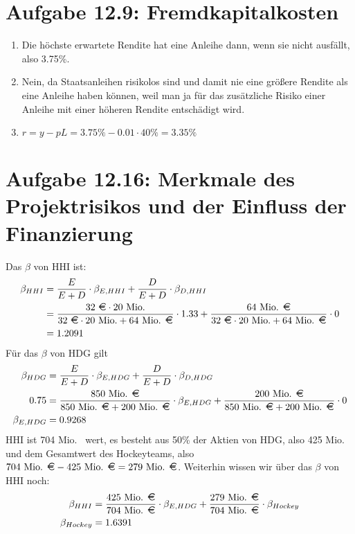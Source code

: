 \documentclass{article}
\begin{document}
	\section*{Aufgabe 12.9: Fremdkapitalkosten}
	\begin{enumerate}[label=(\alph*)]
		\item Die höchste erwartete Rendite hat eine Anleihe dann, wenn sie nicht ausfällt, also 3.75\%.
		\item Nein, da Staatsanleihen risikolos sind und damit nie eine größere Rendite als eine Anleihe haben können, weil man ja für das zusätzliche Risiko einer Anleihe mit einer höheren Rendite entschädigt wird.
		\item $r=y-pL = 3.75\% - 0.01\cdot 40\% = 3.35\%$
	\end{enumerate}

	\section*{Aufgabe 12.16: Merkmale des Projektrisikos und der Einfluss der Finanzierung}
	Das $\beta$ von HHI ist:
	\begin{align}
		\beta_{HHI} &= \frac{E}{E+D}\cdot\beta_{E,HHI} + \frac{D}{E+D}\cdot\beta_{D,HHI} \notag \\
		&= \frac{32\text{ \EUR}\cdot 20\text{ Mio.}}{32\text{ \EUR}\cdot 20\text{ Mio.} + 64\text{ Mio. \EUR}}\cdot 1.33 + \frac{64\text{ Mio. \EUR}}{32\text{ \EUR}\cdot 20\text{ Mio.} + 64\text{ Mio. \EUR}}\cdot 0 \notag \\
		&= 1.2091 \notag
	\end{align}
	Für das $\beta$ von HDG gilt
	\begin{align}
		\beta_{HDG} &= \frac{E}{E+D}\cdot\beta_{E,HDG} + \frac{D}{E+D}\cdot\beta_{D,HDG} \notag \\
		0.75 &= \frac{850\text{ Mio. \EUR}}{850\text{ Mio. \EUR} + 200\text{ Mio. \EUR}}\cdot \beta_{E,HDG} + \frac{200\text{ Mio. \EUR}}{850\text{ Mio. \EUR} + 200\text{ Mio. \EUR}}\cdot 0 \notag \\
		\beta_{E,HDG} &= 0.9268\notag
	\end{align}
	HHI ist 704 Mio. \EUR\, wert, es besteht aus 50\% der Aktien von HDG, also 425 Mio. \EUR\, und dem Gesamtwert des Hockeyteams, also $704\text{ Mio. \EUR} - 425\text{ Mio. \EUR} = 279\text{ Mio. \EUR}$. Weiterhin wissen wir über das $\beta$ von HHI noch:
	\begin{align}
		\beta_{HHI} &= \frac{425\text{ Mio. \EUR}}{704\text{ Mio. \EUR}}\cdot\beta_{E,HDG} + \frac{279\text{ Mio. \EUR}}{704\text{ Mio. \EUR}}\cdot\beta_{Hockey} \notag \\
		\beta_{Hockey} &= 1.6391 \notag
	\end{align}
\end{document}

